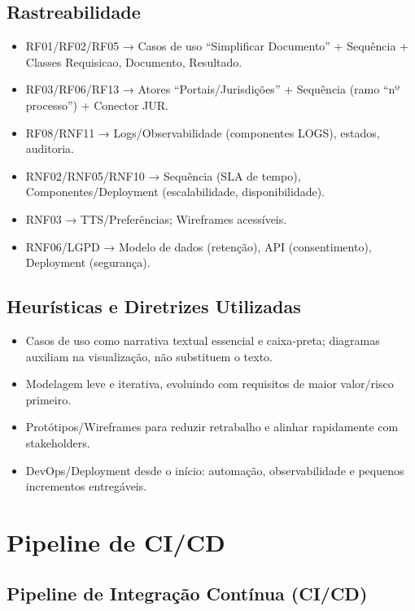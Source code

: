 \documentclass{article}
\begin{document}
\subsection{Rastreabilidade }
\begin{itemize}
    \item RF01/RF02/RF05 → Casos de uso “Simplificar Documento” + Sequência + Classes Requisicao, Documento, Resultado.
    \item RF03/RF06/RF13 → Atores “Portais/Jurisdições” + Sequência (ramo “nº processo”) + Conector JUR.
    \item RF08/RNF11 → Logs/Observabilidade (componentes LOGS), estados, auditoria.
    \item RNF02/RNF05/RNF10 → Sequência (SLA de tempo), Componentes/Deployment (escalabilidade, disponibilidade).
    \item RNF03 → TTS/Preferências; Wireframes acessíveis.
    \item RNF06/LGPD → Modelo de dados (retenção), API (consentimento), Deployment (segurança).
\end{itemize}

\subsection{Heurísticas e Diretrizes Utilizadas}
\begin{itemize}
    \item Casos de uso como narrativa textual essencial e caixa-preta; diagramas auxiliam na visualização, não substituem o texto.
    \item Modelagem leve e iterativa, evoluindo com requisitos de maior valor/risco primeiro.
    \item Protótipos/Wireframes para reduzir retrabalho e alinhar rapidamente com stakeholders.
    \item DevOps/Deployment desde o início: automação, observabilidade e pequenos incrementos entregáveis.
\end{itemize}

\newpage

\section{Pipeline de CI/CD}

\subsection{Pipeline de Integração Contínua (CI/CD)}
\end{document}

